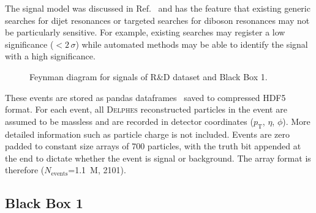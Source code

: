 \documentclass[a4paper,11pt]{article}
\begin{document}
The signal model was discussed in Ref.~\cite{1907.06659} and has the feature that existing generic searches for dijet resonances or targeted searches for diboson resonances may not be particularly sensitive.  For example, existing searches may register a low significance ($<2\,\sigma$) while automated methods may be able to identify the signal with a high significance.


\begin{figure}[h!]
\centering


\caption{Feynman diagram for signals of R\&D dataset and Black Box 1.}
\label{fig:bb1sig}
\end{figure}

These events are stored as pandas dataframes~\cite{mckinney-proc-scipy-2010} saved to compressed HDF5~\cite{koranne2011hierarchical} format. For each event, all \textsc{Delphes} reconstructed particles in the event are assumed to be massless and are recorded in detector coordinates ($p_\text{T}$, $\eta$, $\phi$). More detailed information such as particle charge is not included. Events are zero padded to constant size arrays of 700 particles, with the truth bit appended at the end to dictate whether the event is signal or background. The array format is therefore ($N_\text{events}$=1.1~M, 2101).

\subsection{Black Box 1}
\label{sec:challenge_bb1}
\end{document}
